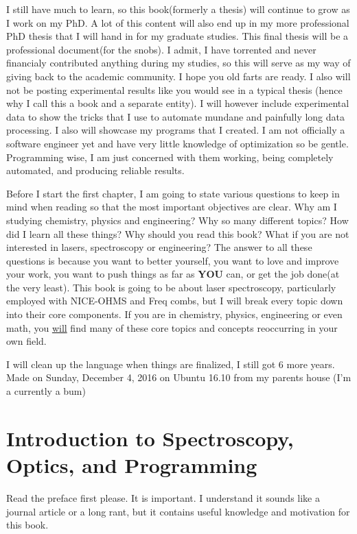 \documentclass[11pt,a4paper]{book}
\begin{document}
	I still have much to learn, so this book(formerly a thesis) will continue to grow as I work on my PhD. A lot of this content will also end up in my more professional PhD thesis that I will hand in for my graduate studies. This final thesis will be a professional document(for the snobs). I admit, I have torrented and never financialy contributed anything during my studies, so this will serve as my way of giving back to the academic community. I hope you old farts are ready. I also will not be posting experimental results like you would see in a typical thesis (hence why I call this a book and a separate entity). I will however include experimental data to show the tricks that I use to automate mundane and painfully long data processing. I also will showcase my programs that I created. I am not officially a software engineer yet and have very little knowledge of optimization so be gentle. Programming wise, I am just concerned with them working, being completely automated, and producing reliable results.
	
	Before I start the first chapter, I am going to state various questions to keep in mind when reading so that the most important objectives are clear. Why am I studying chemistry, physics and engineering? Why so many different topics? How did I learn all these things? Why should you read this book? What if you are not interested in lasers, spectroscopy or engineering? The answer to all these questions is because you want to better yourself, you want to love and improve your work, you want to push things as far as {\bfseries YOU} can, or get the job done(at the very least). This book is going to be about laser spectroscopy, particularly employed with NICE-OHMS and Freq combs, but I will break every topic down into their core components. If you are in chemistry, physics, engineering or even math, you {\underline{will}} find many of these core topics and concepts reoccurring in your own field.
	
	I will clean up the language when things are finalized, I still got 6 more years. Made on Sunday, December 4, 2016 on Ubuntu 16.10 from my parents house (I'm a currently a bum)
	
\mainmatter
\chapter{Introduction to Spectroscopy, Optics, and Programming}
	\label{chp:Introduction to Spectroscopy, Optics, and Programming}
	Read the preface first please. It is important. I understand it sounds like a journal article or a long rant, but it contains useful knowledge and motivation for this book.
	
\end{document}
